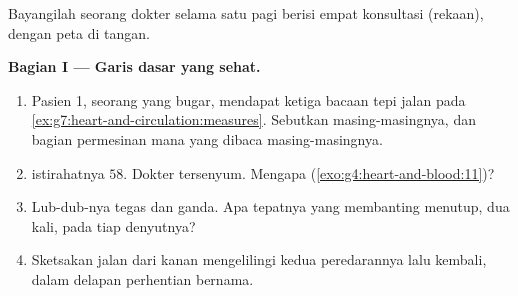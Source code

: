 \begin{problem}\label{pb:g7:heart-and-circulation:1}
Bayangilah seorang dokter  selama satu pagi berisi empat
konsultasi (rekaan), dengan peta di tangan.

\medskip\noindent\textbf{Bagian I --- Garis dasar yang
sehat.}
\begin{enumerate}
  \item Pasien 1, seorang  yang bugar, mendapat ketiga bacaan
        tepi jalan pada
        \cref{ex:g7:heart-and-circulation:measures}. Sebutkan
        masing-masingnya, dan bagian permesinan mana yang dibaca
        masing-masingnya.
  \item {} istirahatnya $58$. Dokter  tersenyum.
        Mengapa
        (\cref{exo:g4:heart-and-blood:11})?
  \item Lub-dub-nya tegas dan ganda. Apa tepatnya yang membanting
        menutup, dua kali, pada tiap denyutnya?
  \item Sketsakan jalan  dari  kanan mengelilingi kedua
        peredarannya lalu kembali, dalam delapan perhentian bernama.
\end{enumerate}


\end{problem}
